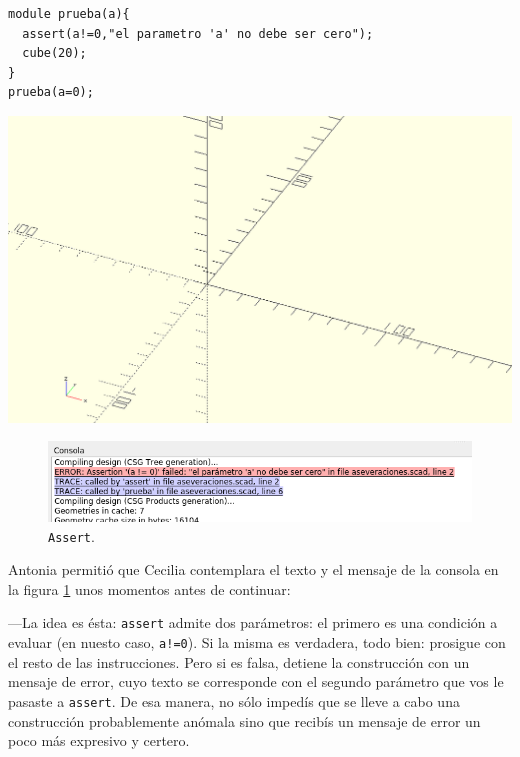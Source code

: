   \begin{minipage}[]{.62\textwidth}%
    \begin{lstlisting}
module prueba(a){
  assert(a!=0,"el parametro 'a' no debe ser cero");
  cube(20);
} 
prueba(a=0);
    \end{lstlisting}%
  \end{minipage}\hfill
   \begin{minipage}[]{.37\textwidth}%
       \centering
       \includegraphics[width=.85\textwidth]{imagenes/vacio}
\end{minipage}

\begin{figure}[ht]
  \centering
  \includegraphics[width=1\textwidth]{imagenes/assert-1}  
  \caption{\texttt{Assert}.}
  \label{fig:assert-1}
\end{figure}


Antonia permitió que Cecilia contemplara el texto y el mensaje de la
consola en la figura \ref{fig:assert-1} unos momentos antes de
continuar:

---La idea es ésta: \lstinline!assert!  admite dos parámetros: el
primero es una condición a evaluar (en nuesto caso, \texttt{a!=0}). Si
la misma es verdadera, todo bien: \openscad{} prosigue con el resto de
las instrucciones. Pero si es falsa, detiene la construcción con un
mensaje de error, cuyo texto se corresponde con el segundo parámetro
que vos le pasaste a \lstinline!assert!. De esa manera, no sólo
impedís que se lleve a cabo una construcción probablemente anómala
sino que recibís un mensaje de error un poco más expresivo y certero.

